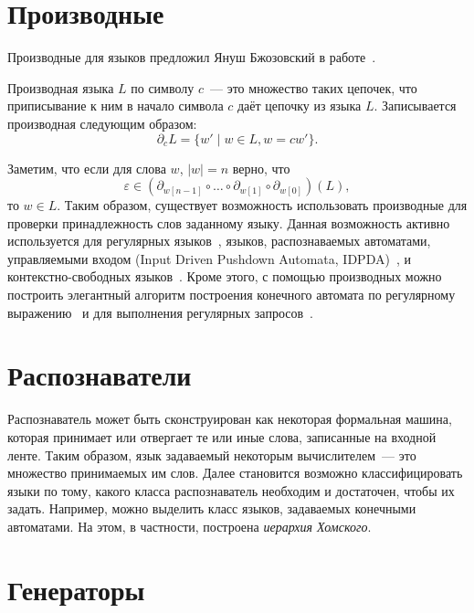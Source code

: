 \section{Производные}

Производные для языков предложил Януш Бжозовский в работе~.

\begin{definition}
    Производная языка $L$ по символу $c$~--- это множество таких цепочек, что приписывание к ним в начало символа $c$ даёт цепочку из языка $L$.
    Записывается производная следующим образом: \[\partial_c L = \{ w' \mid w \in L, w = cw'\}.\]
\end{definition}

Заметим, что если для слова $w$, $|w| = n$ верно, что
\[\varepsilon \in (\partial_{w[n-1]} \circ \dots \circ \partial_{w[1]}  \circ \partial_{w[0]}) (L),\]
то $w \in L$.
Таким образом, существует возможность использовать производные для проверки принадлежность слов заданному языку.
Данная возможность активно используется для регулярных языков~, языков, распознаваемых автоматами, управляемыми входом (Input Driven Pushdown Automata, IDPDA)~, и контекстно-свободных языков~.
Кроме этого, с помощью производных можно построить элегантный алгоритм построения конечного автомата по регулярному выражению~ и для выполнения регулярных запросов~.

\section{Распознаватели}

Распознаватель может быть сконструирован как некоторая формальная машина, которая принимает или отвергает те или иные слова, записанные на входной ленте.
Таким образом, язык задаваемый некоторым вычислителем~--- это множество принимаемых им слов.
Далее становится возможно классифицировать языки по тому, какого класса распознаватель необходим и достаточен, чтобы их задать.
Например, можно выделить класс языков, задаваемых конечными автоматами.
На этом, в частности, построена \emph{иерархия Хомского}.

\section{Генераторы}

